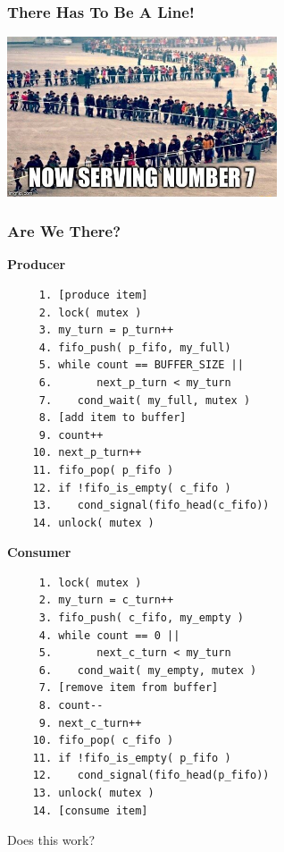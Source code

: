 \begin{frame}
	\frametitle{There Has To Be A Line!}

	\begin{center}
		\includegraphics[width=0.6\textwidth]{images/now_serving2}
	\end{center}
\end{frame}

\begin{frame}[fragile]
	\frametitle{Are We There?}

	\begin{multicols}{2}
		\footnotesize
		\textbf{Producer}
		\begin{verbatim}
	 1. [produce item]
	 2. lock( mutex )
	 3. my_turn = p_turn++
	 4. fifo_push( p_fifo, my_full)
	 5. while count == BUFFER_SIZE ||
	 6.       next_p_turn < my_turn
	 7.    cond_wait( my_full, mutex )
	 8. [add item to buffer]
	 9. count++
	10. next_p_turn++
	11. fifo_pop( p_fifo )
	12. if !fifo_is_empty( c_fifo )
	13.    cond_signal(fifo_head(c_fifo))
	14. unlock( mutex )
		\end{verbatim}
		\columnbreak
		\textbf{Consumer}\vspace{-2em}
		\begin{verbatim}
	 1. lock( mutex )
	 2. my_turn = c_turn++
	 3. fifo_push( c_fifo, my_empty )
	 4. while count == 0 ||
	 5.       next_c_turn < my_turn
	 6.    cond_wait( my_empty, mutex )
	 7. [remove item from buffer]
	 8. count--
	 9. next_c_turn++
	10. fifo_pop( c_fifo )
	11. if !fifo_is_empty( p_fifo )
	12.    cond_signal(fifo_head(p_fifo))
	13. unlock( mutex )
	14. [consume item]
		\end{verbatim}
	\end{multicols}
	\vspace{-2em}

	Does this work?
\end{frame}



